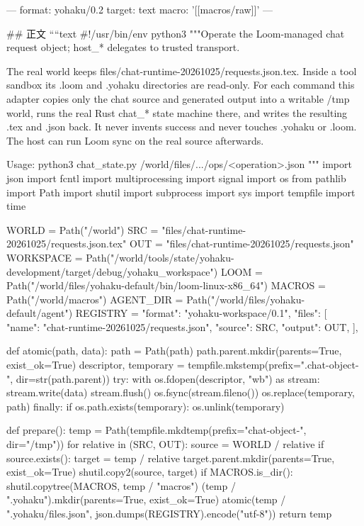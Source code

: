 ---
format: yohaku/0.2
target: text
macro: '[[macros/raw]]'
---

## 正文
````text
#!/usr/bin/env python3
"""Operate the Loom-managed chat request object; host_* delegates to trusted transport.

The real world keeps files/chat-runtime-20261025/requests.json.tex. Inside a
tool sandbox its .loom and .yohaku directories are read-only. For each command
this adapter copies only the chat source and generated output into a writable
/tmp world, runs the real Rust chat_* state machine there, and writes the
resulting .tex and .json back. It never invents success and never touches
.yohaku or .loom. The host can run Loom sync on the real source afterwards.

Usage: python3 chat_state.py /world/files/.../ops/<operation>.json
"""
import json
import fcntl
import multiprocessing
import signal
import os
from pathlib import Path
import shutil
import subprocess
import sys
import tempfile
import time

WORLD = Path("/world")
SRC = "files/chat-runtime-20261025/requests.json.tex"
OUT = "files/chat-runtime-20261025/requests.json"
WORKSPACE = Path("/world/tools/state/yohaku-development/target/debug/yohaku_workspace")
LOOM = Path("/world/files/yohaku-default/bin/loom-linux-x86_64")
MACROS = Path("/world/macros")
AGENT_DIR = Path("/world/files/yohaku-default/agent")
REGISTRY = {
    "format": "yohaku-workspace/0.1",
    "files": [{
        "name": "chat-runtime-20261025/requests.json",
        "source": SRC,
        "output": OUT,
    }],
}


def atomic(path, data):
    path = Path(path)
    path.parent.mkdir(parents=True, exist_ok=True)
    descriptor, temporary = tempfile.mkstemp(prefix=".chat-object-", dir=str(path.parent))
    try:
        with os.fdopen(descriptor, "wb") as stream:
            stream.write(data)
            stream.flush()
            os.fsync(stream.fileno())
        os.replace(temporary, path)
    finally:
        if os.path.exists(temporary):
            os.unlink(temporary)


def prepare():
    temp = Path(tempfile.mkdtemp(prefix="chat-object-", dir="/tmp"))
    for relative in (SRC, OUT):
        source = WORLD / relative
        if source.exists():
            target = temp / relative
            target.parent.mkdir(parents=True, exist_ok=True)
            shutil.copy2(source, target)
    if MACROS.is_dir():
        shutil.copytree(MACROS, temp / "macros")
    (temp / ".yohaku").mkdir(parents=True, exist_ok=True)
    atomic(temp / ".yohaku/files.json", json.dumps(REGISTRY).encode("utf-8"))
    return temp


